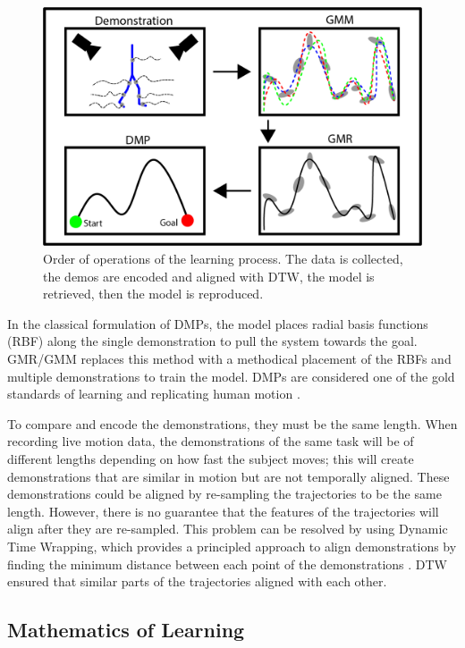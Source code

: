 \begin{figure} 
    \centering 
    \includegraphics[scale=0.25]{images/background/demo_figure.png} 
    \caption[Learning Process]{Order of operations of the learning process. The data is collected, the demos are encoded and aligned with DTW, the model is retrieved, then the model is reproduced.} 
    \label{fig:demostation} 
\end{figure} 


In the classical formulation of DMPs, the model places radial basis functions (RBF) along the single demonstration to pull the system towards the goal. GMR/GMM replaces this method with a methodical placement of the RBFs and multiple demonstrations to train the model. DMPs are considered one of the gold standards of learning and replicating human motion \cite{nakanishi2004learning}.


To compare and encode the demonstrations, they must be the same length. When recording live motion data, the demonstrations of the same task will be of different lengths depending on how fast the subject moves; this will create demonstrations that are similar in motion but are not temporally aligned. These demonstrations could be aligned by re-sampling the trajectories to be the same length. However, there is no guarantee that the features of the trajectories will align after they are re-sampled. This problem can be resolved by using Dynamic Time Wrapping, which provides a principled approach to align demonstrations by finding the minimum distance between each point of the demonstrations \cite{JSSv031i07}. DTW ensured that similar parts of the trajectories aligned with each other. 

\subsection{Mathematics of Learning}
 

